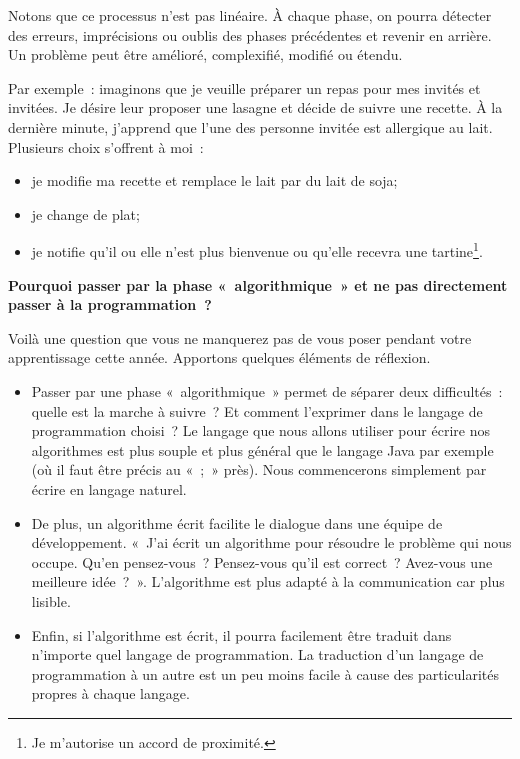 		Notons que ce processus n’est pas linéaire. À chaque phase, on pourra
		détecter des erreurs, imprécisions ou oublis des phases précédentes et
		revenir en arrière. Un problème peut être amélioré, complexifié, modifié
		ou étendu. 

		Par exemple~: imaginons que je veuille préparer un repas pour mes
		invités et invitées. Je désire leur proposer une lasagne et décide de
		suivre une recette. À la dernière minute, j'apprend que l'une des
		personne invitée est allergique au lait. Plusieurs choix s'offrent à moi~: 

		\begin{itemize}
			\item je modifie ma recette et remplace le lait par du lait de soja;
			\item je change de plat;
			\item je notifie qu'il ou elle n'est plus bienvenue ou qu'elle 
				recevra une tartine\footnote{Je m'autorise un accord de 
				proximité.}.
		\end{itemize}

	
		\textbf{Pourquoi passer par la phase «~algorithmique~» 
			et ne pas directement passer à la programmation~?}
		
		Voilà une question que vous ne manquerez pas de vous poser 
		pendant votre apprentissage cette année. 
		Apportons quelques éléments de réflexion.
	
		\begin{itemize}
		\item
			Passer par une phase «~algorithmique~» 
			permet de séparer deux difficultés~:~
			quelle est la marche à suivre~? 
			Et comment l’exprimer dans le langage de programmation choisi~? 
			Le langage que nous allons utiliser pour écrire nos algorithmes
			est plus souple et plus général que le langage Java
			par exemple (où il faut être précis au «~;~» près). Nous commencerons 
			simplement par écrire en langage naturel. 
		\item
			De plus, un algorithme écrit facilite le dialogue 
			dans une équipe de développement. 
			«~J’ai écrit un algorithme 
			pour résoudre le problème qui nous occupe. 
			Qu’en pensez-vous~? Pensez-vous qu’il est correct~?
			Avez-vous une meilleure idée~?~». 
			L’algorithme est plus adapté à la communication car plus lisible.
		\item
			Enfin, si l’algorithme est écrit, 
			il pourra facilement être traduit
			dans n’importe quel langage de programmation. 
			La traduction d’un langage de programmation à un autre
			est un peu moins facile 
			à cause des particularités propres à chaque langage.
		\end{itemize}
	
